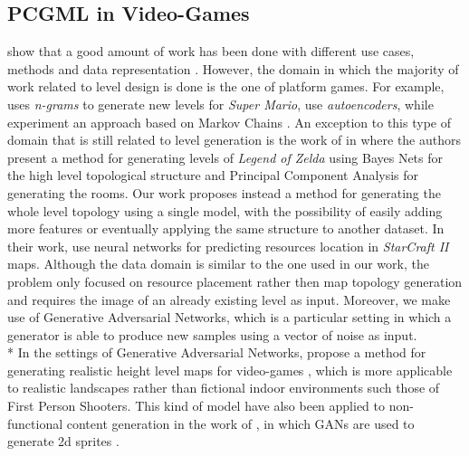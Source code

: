 \subsection{PCGML in Video-Games} 
\citeauthor{PCGML} show that a good amount of work has been done with different use cases, methods and data representation \cite{PCGML}. However, the domain in which the majority of work related to level design is done is the one of platform games. For example, \citeauthor{mariongrams} \cite{mariongrams} uses \textit{n-grams} to generate new levels for \textit{Super Mario}\cite{game:supermario}, \citeauthor{levelsautoencoder} use \textit{autoencoders}, while \citeauthor{mariomarkovchains} experiment an approach based on Markov Chains \cite{mariomarkovchains}. 
An exception to this type of domain that is still related to level generation is the work of \citeauthor{zeldalevels} in \cite{zeldalevels} where the authors present a method for generating levels of \textit{Legend of Zelda}\cite{game:zelda} using Bayes Nets for the high level topological structure and Principal Component Analysis for generating the rooms. Our work proposes instead a method for generating the whole level topology using a single model, with the possibility of easily adding more features or eventually applying the same structure to another dataset. \newline
In their work, \citeauthor{resourcelocation} \cite{resourcelocation} use neural networks for predicting resources location in \textit{StarCraft II}\cite{game:starcraft} maps. Although the data domain is similar to the one used in our work, the problem only focused on resource placement rather then map topology generation and requires the image of an already existing level as input. Moreover, we make use of Generative Adversarial Networks, which is a particular setting in which a generator is able to produce new samples using a vector of noise as input. \\* 
In the settings of Generative Adversarial Networks, \citeauthor{heightgen} propose a method for generating realistic height level maps for video-games \cite{heightgen}, which is more applicable to realistic landscapes rather than fictional indoor environments such those of First Person Shooters. This kind of model have also been applied to non-functional content generation in the work of \citeauthor{spritegen}, in which GANs are used to generate 2d sprites \cite{spritegen}.
 

